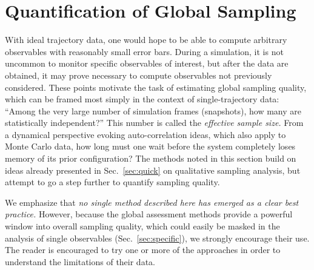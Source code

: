 \section{Quantification of Global Sampling}
\label{sec:global}


With ideal trajectory data, one would hope to be able to compute arbitrary observables with reasonably small error bars.
During a simulation, it is not uncommon to monitor specific observables of interest, but after the data are obtained, it may prove necessary to compute observables not previously considered.
These points motivate the task of estimating global sampling quality, which can be framed most simply in the context of single-trajectory data:
``Among the very large number of simulation frames (snapshots), how many are statistically independent?''
This number is called the \emph{effective sample size.}
From a dynamical perspective evoking auto-correlation ideas, which also apply to Monte Carlo data, how long must one wait before the system completely loses memory of its prior configuration?
The methods noted in this section build on ideas already presented in Sec.\ \ref{sec:quick} on qualitative sampling analysis, but attempt to go a step further to quantify sampling quality.

We emphasize that \emph{no single method described here has emerged as a clear best practice.}
However, because the global assessment methods provide a powerful window into overall sampling quality, which could easily be masked in the analysis of single observables (Sec.\ \ref{sec:specific}), we strongly encourage their use.
The reader is encouraged to try one or more of the approaches in order to understand the limitations of their data.


